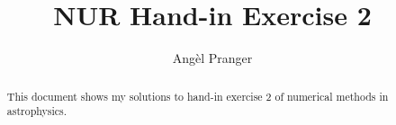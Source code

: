 \documentclass[a4paper,10pt]{article}
\title{NUR Hand-in Exercise 2}
\author{Angèl Pranger}
\begin{document}
\maketitle

\begin{abstract}
This document shows my solutions to hand-in exercise 2 of numerical methods in astrophysics.
\end{abstract}




\end{document}
